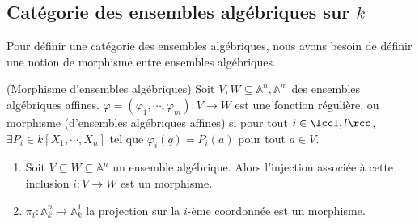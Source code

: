         \subsection{Catégorie des ensembles algébriques sur $k$}
            Pour définir une catégorie des ensembles algébriques, nous avons besoin de définir une notion de morphisme entre ensembles algébriques.


            \begin{defi} (Morphisme d'ensembles algébriques)
                \label{ensalgmor}
                Soit $V,W \subseteq \mathbb{A}^n, \mathbb{A}^m$ des ensembles algébriques affines. $\varphi = (\varphi_1, \cdots, \varphi_m) : V \to W$ est une fonction régulière, ou morphisme (d'ensembles algébriques affines) si pour tout $i \in \lcc 1,l \rcc$, $\exists P_i \in k[X_1, \cdots, X_n]$ tel que $\varphi_i(q) = P_i(a)$ pour tout $a \in V$.
            \end{defi}

            \begin{expl}
                \begin{enumerate}
                    \item Soit $V \subseteq W \subseteq \mathbb{A}^n$ un ensemble algébrique. Alors l'injection associée à cette inclusion $i : V \to W$ est un morphisme.
                    \item $\pi_i : \mathbb{A}^n_k \to \mathbb{A}_k^1$ la projection sur la $i$-ème coordonnée est un morphisme.
                \end{enumerate}
            \end{expl}

